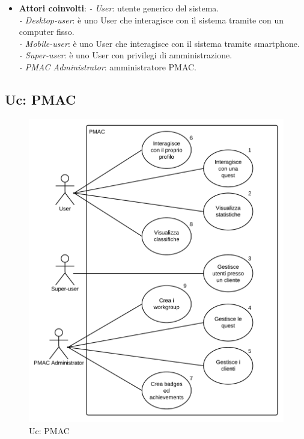 \documentclass[10pt,a4paper]{article}
\begin{document}
\begin{itemize}

\item \textbf{Attori coinvolti}:
\emph{- User}: utente generico del sistema.\\
\emph{- Desktop-user}: è uno User che interagisce con il sistema tramite con un computer fisso.\\
\emph{- Mobile-user}: è uno User che interagisce con il sistema tramite smartphone.\\
\emph{- Super-user}: è uno User con privilegi di amministrazione.\\
\emph{- PMAC Administrator}: amministratore PMAC.
\end{itemize}

\newpage

\subsection{Uc: PMAC}
\begin{figure}[ht]
\centering
\caption{Uc: PMAC}
\includegraphics[scale=0.69]{UseCase/UcPMAC} %
\end{figure}
\end{document}
